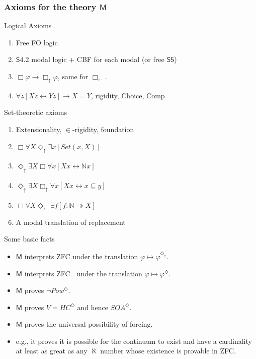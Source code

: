 \documentclass{beamer}
\newcommand{\du}{\Diamond_\uparrow}
\newcommand{\dl}{\Diamond_\leftarrow}
\newcommand{\bu}{\Box_\uparrow}
\newcommand{\bl}{\Box_\leftarrow}
\begin{document}
\begin{frame}
    \frametitle{Axioms for the theory $\mathsf{M}$}
    \begin{block}{Logical Axioms}
    \begin{enumerate}
        \item<2-> Free FO logic
        \item<3-> $\mathsf{S4.2}$ modal logic + CBF for each modal (or free $\mathsf{S5}$)
        \item<4-> $\Box \varphi \rightarrow \bu \varphi$, same for $\bl$.
        \item<5-> $\forall z[Xz \leftrightarrow Yz] \rightarrow X = Y$, rigidity,
        Choice, Comp
    \end{enumerate}
    \end{block}
    \begin{block}{Set-theoretic axioms}
        \begin{enumerate}
        \item<7-> Extensionality, $\in$-rigidity, foundation
        \item<8-> $\Box \forall X \du \exists x [Set(x, X)]$
        \item<9-> $\du \exists X \Box \forall x[Xx \leftrightarrow \mathbb{N}x]$
        \item<10-> $\du \exists X \bu \forall x[Xx \leftrightarrow x \subseteq y]$
        \item<11-> $\Box \forall X \dl \exists f [f : \mathbb{N} \twoheadrightarrow X]$
        \item<12-> A modal translation of replacement
        \end{enumerate}
    \end{block}
\end{frame}
\begin{frame}{Some basic facts}
    \begin{itemize}
        \item<2-> $\mathsf{M}$ interprets ZFC under the translation 
                    $\varphi \mapsto \varphi^{\Diamond_\uparrow}$. 
        \item<3-> $\mathsf{M}$ interprets ZFC$^-$ under the translation 
                    $\varphi \mapsto \varphi^\Diamond$.
        \item<4-> $\mathsf{M}$ proves $\neg Pow^\Diamond$.
        \item<5-> $\mathsf{M}$ proves $V = HC^\Diamond$ and hence $SOA^\Diamond$.
        \item<6-> $\mathsf{M}$ proves the universal possibility of forcing.
        \item<7-> e.g., it proves it is possible for the continuum 
                    to exist and have a cardinality at least as great as 
                    any $\aleph$ number whose existence is provable 
                    in ZFC.
    \end{itemize}
\end{frame}
\end{document}
